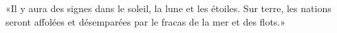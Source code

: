 \encetemps \jesusdisciples
	«Il y aura des signes dans le soleil, la lune et les étoiles.
Sur terre, les nations seront affolées et désemparées
	par le fracas de la mer et des flots.»
